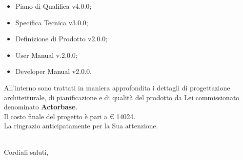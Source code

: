 \documentclass[10pt,a4paper]{letter} %
\begin{document}
\begin{letter}{}
\begin{itemize}
\begin{itemize}
    \item Piano di Qualifica v4.0.0;
    \item Specifica Tecnica v3.0.0;
    \item Definizione di Prodotto v2.0.0;
    \item User Manual v.2.0.0;
    \item Developer Manual v2.0.0.
    \end{itemize}
  \end{itemize}
  All'interno sono trattati in maniera approfondita i dettagli di progettazione architetturale, di pianificazione e di qualità
  del prodotto da Lei commissionato denominato \textbf{Actorbase}.\\ Il costo finale del progetto è pari a \euro{} 14024.\\
  La ringrazio anticipatamente per la Sua attenzione. \\ \\
  \closing{Cordiali saluti,}
\end{letter}
\end{document}
